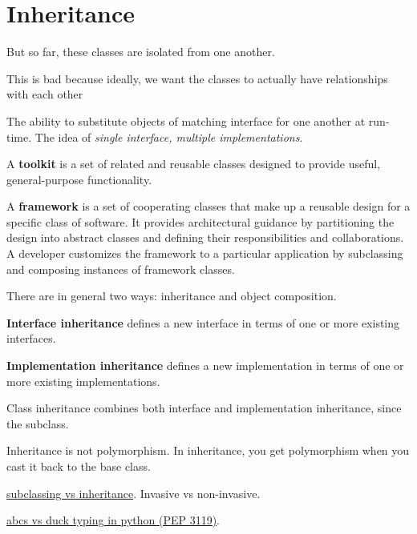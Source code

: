 \section{Inheritance} 

  But so far, these classes are isolated from one another. 


  This is bad because ideally, we want the classes to actually have relationships with each other 

  \begin{definition}[Polymorphism] 
    The ability to substitute objects of matching interface for one another at run-time. 
    The idea of \textit{single interface, multiple implementations}. 
  \end{definition}

  \begin{definition}[Toolkit]
    A \textbf{toolkit} is a set of related and reusable classes designed to provide useful, general-purpose functionality. 
  \end{definition}

  \begin{definition}[Framework]
    A \textbf{framework} is a set of cooperating classes that make up a reusable design for a specific class of software. It provides architectural guidance by partitioning the design into abstract classes and defining their responsibilities and collaborations. A developer customizes the framework to a particular application by subclassing and composing instances of framework classes. 
  \end{definition} 

  There are in general two ways: inheritance and object composition. 

  \begin{definition} 
    \textbf{Interface inheritance} defines a new interface in terms of one or more existing interfaces. 
  \end{definition}

  \begin{definition}
    \textbf{Implementation inheritance} defines a new implementation in terms of one or more existing implementations. 
  \end{definition}  

  Class inheritance combines both interface and implementation inheritance, since the subclass.  

  Inheritance is not polymorphism. In inheritance, you get polymorphism when you cast it back to the base class. 

  \href{https://stackoverflow.com/questions/3392352/python-abcs-registering-vs-subclassing}{subclassing vs inheritance}. Invasive vs non-invasive. 
 
  \href{https://peps.python.org/pep-3119/#abcs-vs-duck-typing}{abcs vs duck typing in python (PEP 3119)}.
